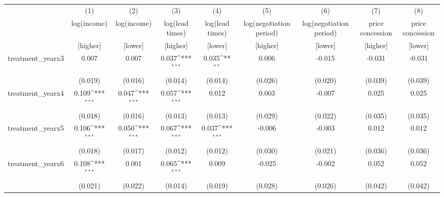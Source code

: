 {
\def\sym#1{\ifmmode^{#1}\else\(^{#1}\)\fi}
\begin{adjustbox}{max width=\textwidth}
\begin{tabular}{l*{8}{c}}
\toprule
            &\multicolumn{1}{c}{(1)}&\multicolumn{1}{c}{(2)}&\multicolumn{1}{c}{(3)}&\multicolumn{1}{c}{(4)}&\multicolumn{1}{c}{(5)}&\multicolumn{1}{c}{(6)}&\multicolumn{1}{c}{(7)}&\multicolumn{1}{c}{(8)}\\
            &\multicolumn{1}{c}{log(income)}&\multicolumn{1}{c}{log(income)}&\multicolumn{1}{c}{log(lead times)}&\multicolumn{1}{c}{log(lead times)}&\multicolumn{1}{c}{log(negotiation period)}&\multicolumn{1}{c}{log(negotiation period)}&\multicolumn{1}{c}{price concession}&\multicolumn{1}{c}{price concession}\\
&[higher]&[lower]&[higher]&[lower]&[higher]&[lower]&[higher]&[lower]\\
\midrule
treatment\_yearx3&       0.007         &       0.007         &       0.037\sym{***}&       0.035\sym{**} &       0.006         &      -0.015         &      -0.031         &      -0.031         \\
            &     (0.019)         &     (0.016)         &     (0.014)         &     (0.014)         &     (0.026)         &     (0.020)         &     (0.039)         &     (0.039)         \\
\addlinespace
treatment\_yearx4&       0.109\sym{***}&       0.047\sym{***}&       0.057\sym{***}&       0.012         &       0.003         &      -0.007         &       0.025         &       0.025         \\
            &     (0.018)         &     (0.016)         &     (0.013)         &     (0.013)         &     (0.029)         &     (0.022)         &     (0.035)         &     (0.035)         \\
\addlinespace
treatment\_yearx5&       0.106\sym{***}&       0.050\sym{***}&       0.067\sym{***}&       0.037\sym{***}&      -0.006         &      -0.003         &       0.012         &       0.012         \\
            &     (0.018)         &     (0.017)         &     (0.012)         &     (0.012)         &     (0.030)         &     (0.021)         &     (0.036)         &     (0.036)         \\
\addlinespace
treatment\_yearx6&       0.108\sym{***}&       0.001         &       0.065\sym{***}&       0.009         &      -0.025         &      -0.002         &       0.052         &       0.052         \\
            &     (0.021)         &     (0.022)         &     (0.014)         &     (0.019)         &     (0.028)         &     (0.026)         &     (0.042)         &     (0.042)         \\

\end{tabular}
\end{adjustbox}}
